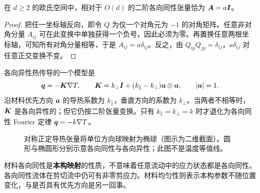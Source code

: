 \begin{proposition}[二阶各向同性张量]
在 $d\ge2$ 的欧氏空间中，相对于 $O(d)$ 的二阶各向同性张量恰为 $\bm{A}=a\bm{I}$。
\end{proposition}
\begin{proof}
把任一坐标轴反向，即令 $Q$ 为仅一个对角元为 $-1$ 的对角矩阵。任意非对角分量 $A_{ij}$ 可在此变换中单独获得一个负号，因此必须为零。再置换任意两根坐标轴，可知所有对角分量相等，于是 $A_{ij}=a\delta_{ij}$。反之，由 $Q_{ip}Q_{jp}=\delta_{ij}$，$a\delta_{ij}$ 对任意正交变换不变。
\end{proof}

各向异性热传导的一个模型是
\begin{equation}
 \bm{q}=-\bm{K}\nabla T,\qquad
 \bm{K}=k_\perp\bm{I}+(k_\parallel-k_\perp)\bm{a}\otimes\bm{a},
 \qquad |\bm{a}|=1.
\end{equation}
沿材料优先方向 $\bm{a}$ 的导热系数为 $k_\parallel$，垂直方向的系数为 $k_\perp$。当两者不相等时，$\bm{K}$ 是各向异性的；但它仍按二阶张量变换。只有 $k_\parallel=k_\perp=k$ 时才退化为各向同性 Fourier 定律 $\bm{q}=-k\nabla T$。

\begin{figure}[htbp]
\centering
{}
\caption{对称正定导热张量将单位方向球映射为椭球（图示为二维截面）。圆形与椭圆形分别示意各向同性与各向异性；此图不是温度等值线。}
\end{figure}

\begin{keypoint}
材料各向同性是\textbf{本构映射}的性质，不意味着任意流动中的应力状态都是各向同性。各向同性流体在剪切流中仍可有非零剪应力。材料均匀性则表示本构参数不随位置变化，与是否具有优先方向是另一回事。
\end{keypoint}

